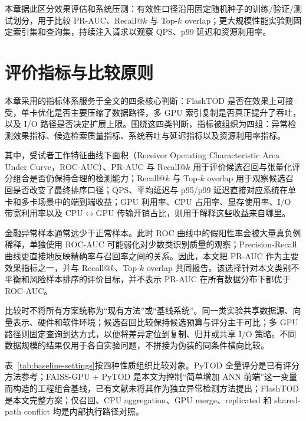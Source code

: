 本章据此区分效果评估和系统压测：有效性口径沿用固定随机种子的训练/验证/测试划分，用于比较 PR-AUC、Recall@$k$ 与 Top-$k$ overlap；更大规模性能实验则固定索引集和查询集，持续注入请求以观察 QPS、p99 延迟和资源利用率。


\section{评价指标与比较原则}

本章采用的指标体系服务于全文的四条核心判断：FlashTOD 是否在效果上可接受，单卡优化是否主要压缩了数据路径，多 GPU 索引复制是否真正提升了吞吐，以及 I/O 路径是否决定扩展上限。围绕这四类判断，指标被组织为四组：异常检测效果指标、候选检索质量指标、系统吞吐与延迟指标以及资源利用率指标。

其中，受试者工作特征曲线下面积（Receiver Operating Characteristic Area Under Curve，ROC-AUC）、PR-AUC 与 Recall@$k$ 用于评价候选召回与张量化评分组合是否仍保持合理的检测能力；Recall@$k$ 与 Top-$k$ overlap 用于观察候选召回是否改变了最终排序口径；QPS、平均延迟与 p95/p99 延迟直接对应系统在单卡和多卡场景中的端到端收益；GPU 利用率、CPU 占用率、显存使用率、I/O 带宽利用率以及 CPU$\leftrightarrow$GPU 传输开销占比，则用于解释这些收益来自哪里。

金融异常样本通常远少于正常样本。此时 ROC 曲线中的假阳性率会被大量真负例稀释，单独使用 ROC-AUC 可能弱化对少数类识别质量的观察；Precision-Recall 曲线更直接地反映精确率与召回率之间的关系\citep{davis2006prroc,saito2015prauc}。因此，本文把 PR-AUC 作为主要效果指标之一，并与 Recall@$k$、Top-$k$ overlap 共同报告。该选择针对本文类别不平衡和风险样本排序的评价目标，并不表示 PR-AUC 在所有数据分布下都优于 ROC-AUC。

比较时不将所有方案统称为“现有方法”或“基线系统”。同一类实验共享数据源、向量表示、硬件和软件环境；候选召回比较保持候选预算与评分主干可比；多 GPU 路径则固定查询到达方式，以便将差异定位到复制、归并或共享 I/O 策略。不同数据规模的结果仅用于各自实验问题，不拼接为伪装的同条件横向比较。

表~\ref{tab:baseline-settings}按四种性质组织比较对象。PyTOD 全量评分是已有评分方法参考；FAISS-GPU + PyTOD 是本文为控制“简单增加 ANN 前端”这一变量而构造的工程组合基线，已有文献未将其作为独立异常检测方法提出；FlashTOD 是本文完整方案；仅召回、CPU aggregation、GPU merge、replicated 和 shared-path conflict 均是内部执行路径对照。

